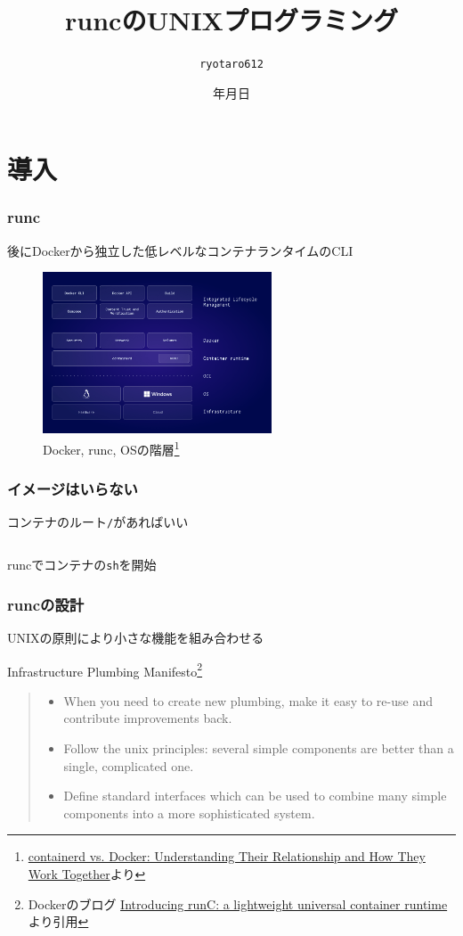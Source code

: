 \documentclass[unicode, 14pt, aspectratio=169]{beamer}
\date{\number\year 年\number\month 月\number\day 日}
\title{runcのUNIXプログラミング}
\author{\texttt{ryotaro612}}
\begin{document}
\begin{frame}
\titlepage
\end{frame}
\section{導入}
\begin{frame}
  \frametitle{runc}
  後にDockerから独立した低レベルなコンテナランタイムのCLI
  \begin{figure}
    \centering
    \includegraphics[width=6.8cm]{images/containerd-diagram-v1.png}
    \caption{Docker, runc, OSの階層\footnote{\scriptsize{\href{https://www.docker.com/blog/containerd-vs-docker}{containerd vs. Docker: Understanding Their Relationship and How They Work Together}より}}}
    \label{fig:runc}
  \end{figure}
\end{frame}
\begin{frame}%
  \frametitle{イメージはいらない}
  コンテナのルート\texttt{/}があればいい
  \begin{center}
    \inputminted[fontsize=\small]{sh}{code/run.sh}
    runcでコンテナの\texttt{sh}を開始\supercite{runc}  
  \end{center}
\end{frame}
\begin{frame}
  \frametitle{runcの設計}
  UNIXの原則により小さな機能を組み合わせる
  \begin{center}
    Infrastructure Plumbing Manifesto\footnote{\scriptsize{Dockerのブログ \href{https://www.docker.com/blog/runc/}{Introducing runC: a lightweight universal container runtime
}より引用}}
    \end{center}
  \begin{quote}
    \begin{itemize}
    \item {\small When you need to create new plumbing, make it easy to re-use and contribute improvements back.}
    \item {\small Follow the unix principles: several simple components are better than a single, complicated one.}
    \item {\small Define standard interfaces which can be used to combine many simple components into a more sophisticated system.}
  \end{itemize}
  \end{quote}
\end{frame}
\end{document}
